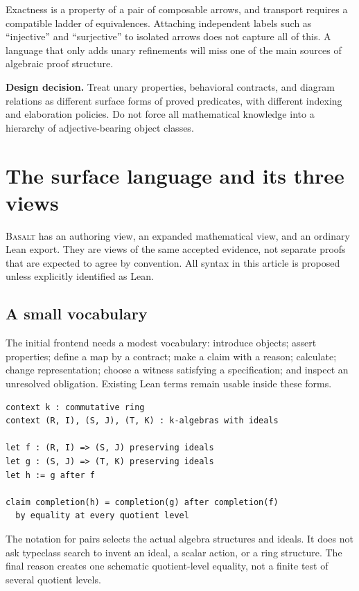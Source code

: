 \documentclass[11pt,a4paper]{article}
\newcommand{\Basalt}{\textsc{Basalt}}
\newcommand{\decision}[1]{\par\smallskip\textbf{Design decision.} #1\par\smallskip}
\theoremstyle{plain}
\theoremstyle{definition}
\theoremstyle{remark}
\begin{document}
Exactness is a property of a pair of composable arrows, and transport requires
a compatible ladder of equivalences. Attaching independent labels such as
``injective'' and ``surjective'' to isolated arrows does not capture all of
this. A language that only adds unary refinements will miss one of the main
sources of algebraic proof structure.

\decision{Treat unary properties, behavioral contracts, and diagram relations
as different surface forms of proved predicates, with different indexing and
elaboration policies. Do not force all mathematical knowledge into a hierarchy
of adjective-bearing object classes.}

\section{The surface language and its three views}
\label{sec:surface}
\Basalt{} has an authoring view, an expanded mathematical view, and an ordinary
Lean export. They are views of the same accepted evidence, not separate proofs
that are expected to agree by convention. All syntax in this article is
proposed unless explicitly identified as Lean.

\subsection{A small vocabulary}
The initial frontend needs a modest vocabulary: introduce objects; assert
properties; define a map by a contract; make a claim with a reason; calculate;
change representation; choose a witness satisfying a specification; and inspect
an unresolved obligation. Existing Lean terms remain usable inside these forms.

\par\noindent\begin{minipage}{\linewidth}
\begin{lstlisting}
context k : commutative ring
context (R, I), (S, J), (T, K) : k-algebras with ideals

let f : (R, I) => (S, J) preserving ideals
let g : (S, J) => (T, K) preserving ideals
let h := g after f

claim completion(h) = completion(g) after completion(f)
  by equality at every quotient level
\end{lstlisting}
\end{minipage}\par

The notation for pairs selects the actual algebra structures and ideals. It
does not ask typeclass search to invent an ideal, a scalar action, or a ring
structure. The final reason creates one schematic quotient-level equality,
not a finite test of several quotient levels.
\end{document}
